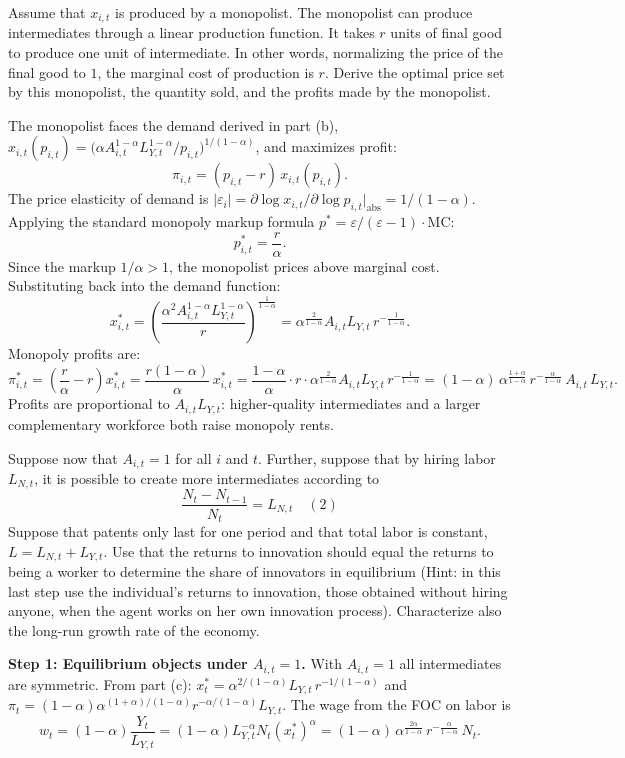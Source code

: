 \documentclass[11pt]{exam}
\begin{document}
\begin{questions}
\question Assume that $x_{i,t}$ is produced by a monopolist. The monopolist can produce intermediates through a linear production function. It takes $r$ units of final good to produce one unit of intermediate. In other words, normalizing the price of the final good to $1$, the marginal cost of production is $r$. Derive the optimal price set by this monopolist, the quantity sold, and the profits made by the monopolist.
\begin{solution}
The monopolist faces the demand derived in part (b), $x_{i,t}(p_{i,t})=\bigl(\alpha A_{i,t}^{1-\alpha}L_{Y,t}^{1-\alpha}/p_{i,t}\bigr)^{1/(1-\alpha)}$, and maximizes profit:
\[
	\pi_{i,t} = (p_{i,t}-r)\,x_{i,t}(p_{i,t}).
\]
The price elasticity of demand is $|\varepsilon_{i}| = \partial \log x_{i,t}/\partial \log p_{i,t}|_{\text{abs}} = 1/(1-\alpha)$.  Applying the standard monopoly markup formula $p^{*}=\varepsilon/({\varepsilon-1})\cdot\text{MC}$:
\[
	\boxed{p_{i,t}^{*} = \frac{r}{\alpha}.}
\]
Since the markup $1/\alpha>1$, the monopolist prices above marginal cost.  Substituting back into the demand function:
\[
	\boxed{x_{i,t}^{*} = \left(\frac{\alpha^{2}A_{i,t}^{1-\alpha}L_{Y,t}^{1-\alpha}}{r}\right)^{\!\frac{1}{1-\alpha}} = \alpha^{\frac{2}{1-\alpha}}A_{i,t}L_{Y,t}\,r^{-\frac{1}{1-\alpha}}.}
\]
Monopoly profits are:
\[
	\pi_{i,t}^{*} = \left(\frac{r}{\alpha}-r\right)x_{i,t}^{*} = \frac{r(1-\alpha)}{\alpha}\,x_{i,t}^{*}
	= \frac{1-\alpha}{\alpha}\cdot r\cdot\alpha^{\frac{2}{1-\alpha}}A_{i,t}L_{Y,t}\,r^{-\frac{1}{1-\alpha}}
	= \boxed{(1-\alpha)\,\alpha^{\frac{1+\alpha}{1-\alpha}}\,r^{-\frac{\alpha}{1-\alpha}}\,A_{i,t}\,L_{Y,t}.}
\]
Profits are proportional to $A_{i,t}L_{Y,t}$: higher-quality intermediates and a larger complementary workforce both raise monopoly rents.
\end{solution}

\question Suppose now that $A_{i,t}=1$ for all $i$ and $t$. Further, suppose that by hiring labor $L_{N,t}$, it is possible to create more intermediates according to
\[
	\frac{N_{t}-N_{t-1}}{N_{t}}=L_{N,t} \quad (2)
\]
Suppose that patents only last for one period and that total labor is constant, $L=L_{N,t}+L_{Y,t}$. Use that the returns to innovation should equal the returns to being a worker to determine the share of innovators in equilibrium (Hint: in this last step use the individual's returns to innovation, those obtained without hiring anyone, when the agent works on her own innovation process). Characterize also the long-run growth rate of the economy.
\begin{solution}
\textbf{Step 1: Equilibrium objects under $A_{i,t}=1$.}
With $A_{i,t}=1$ all intermediates are symmetric.  From part (c): $x_{t}^{*}=\alpha^{2/(1-\alpha)}L_{Y,t}\,r^{-1/(1-\alpha)}$ and $\pi_{t}=(1-\alpha)\alpha^{(1+\alpha)/(1-\alpha)}r^{-\alpha/(1-\alpha)}L_{Y,t}$.  The wage from the FOC on labor is
\[
	w_{t}=(1-\alpha)\frac{Y_{t}}{L_{Y,t}}=(1-\alpha)L_{Y,t}^{-\alpha}N_{t}(x_{t}^{*})^{\alpha}
	= (1-\alpha)\,\alpha^{\frac{2\alpha}{1-\alpha}}\,r^{-\frac{\alpha}{1-\alpha}}\,N_{t}.
\]


\end{solution}
\end{questions}
\end{document}
